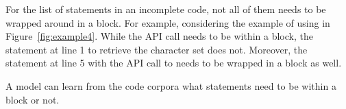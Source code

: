 

For the list of statements in an incomplete code, not all of them
needs to be wrapped around in a  block. For example,
considering the example of using  in
Figure~\ref{fig:example4}. While the API call
 needs to be within a
 block, the statement at line 1 to retrieve the
character set does not. Moreover, the statement at line 5 with the API
call to  needs to be wrapped in a 
block as well.

\begin{Observation} 
  A model can learn from the code corpora what statements need to be
  within a  block or not.
\end{Observation}
